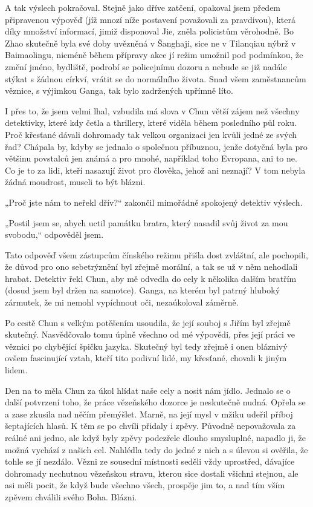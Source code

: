 A tak výslech pokračoval. Stejně jako dříve zatčení, opakoval jsem předem připravenou výpověď (jíž mnozí níže postavení považovali za pravdivou), která díky množství informací, jimiž disponoval Jie, zněla policistům věrohodně. Bo Zhao skutečně byla své doby uvězněná v Šanghaji, sice ne v Tilanqiau nýbrž v Baimaolingu, nicméně během přípravy akce jí režim umožnil pod podmínkou, že změní jméno, bydliště, podrobí se policejnímu dozoru a nebude se již nadále stýkat s žádnou církví, vrátit se do normálního života. Snad všem zaměstnancům věznice, s výjimkou Ganga, tak bylo zadržených upřímně líto.

I přes to, že jsem velmi lhal, vzbudila má slova v Chun větší zájem než všechny detektivky, které kdy četla a thrillery, které viděla během posledního půl roku. Proč křesťané dávali dohromady tak velkou organizaci jen kvůli jedné ze svých řad?  Chápala by, kdyby se jednalo o společnou příbuznou, jenže dotyčná byla pro většinu povstalců jen známá a pro mnohé, například toho Evropana, ani to ne. Co je to za lidi, kteří nasazují život pro člověka, jehož ani neznají? V tom nebyla žádná moudrost, museli to být blázni.

„Proč jste nám to neřekl dřív?“ zakončil mimořádně spokojený detektiv výslech.

„Postil jsem se, abych uctil památku bratra, který nasadil svůj život za mou svobodu,“ odpověděl jsem.

Tato odpověď všem zástupcům čínského režimu přišla dost zvláštní, ale pochopili, že důvod pro ono sebetrýznění byl zřejmě morální, a tak se už v něm nehodlali hrabat. Detektiv řekl Chun, aby mě odvedla do cely k několika dalším bratřím (dosud jsem byl držen na samotce). Ganga, na kterém byl patrný hluboký zármutek, že mi nemohl vypíchnout oči,  nezaúkoloval záměrně.

Po cestě Chun s velkým potěšením usoudila, že její souboj s Jiřím byl zřejmě skutečný. Nasvědčovalo tomu úplně všechno od mé výpovědi, přes její práci ve věznici po chybějící špičku jazyka. Skutečný byl tedy zřejmě i onen bláznivý ovšem fascinující vztah, kteří tito podivní lidé, my křesťané, chovali k jiným lidem. 
 	
Den na to měla Chun za úkol hlídat naše cely a nosit nám jídlo. Jednalo se o další potvrzení toho, že práce vězeňského dozorce je neskutečně nudná. Opřela se a zase zkusila nad něčím přemýšlet. Marně, na její mysl v mžiku udeřil příboj šeptajících hlasů. K těm se po chvíli přidaly i zpěvy. Původně nepovažovala za reálné ani jedno, ale když byly zpěvy podezřele dlouho smysluplné, napadlo ji, že možná vychází z našich cel. Nahlédla tedy do jedné z nich a s úlevou si ověřila, že tohle se jí nezdálo. Vězni ze sousední místnosti seděli vždy uprostřed, dávajíce dohromady nechutnou vězeňskou stravu, kterou sice dostali všichni stejnou, ale asi měli pocit, že když bude všechno všech, prospěje jim to, a nad tím vším zpěvem chválili svého Boha. Blázni.

